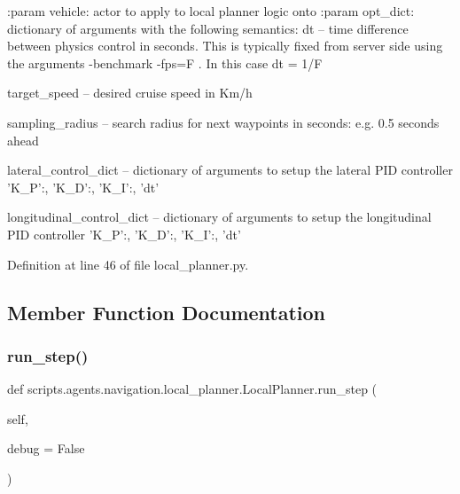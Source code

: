 \begin{DoxyVerb}:param vehicle: actor to apply to local planner logic onto
:param opt_dict: dictionary of arguments with the following semantics:
    dt -- time difference between physics control in seconds. This is typically fixed from server side
  using the arguments -benchmark -fps=F . In this case dt = 1/F

    target_speed -- desired cruise speed in Km/h

    sampling_radius -- search radius for next waypoints in seconds: e.g. 0.5 seconds ahead

    lateral_control_dict -- dictionary of arguments to setup the lateral PID controller
                    {'K_P':, 'K_D':, 'K_I':, 'dt'}

    longitudinal_control_dict -- dictionary of arguments to setup the longitudinal PID controller
                        {'K_P':, 'K_D':, 'K_I':, 'dt'}
\end{DoxyVerb}
 

Definition at line 46 of file local\+\_\+planner.\+py.



\subsection{Member Function Documentation}
\mbox{\label{classscripts_1_1agents_1_1navigation_1_1local__planner_1_1LocalPlanner_aed8c6636540d123d047ee1e71443ae20}} 
\subsubsection{\texorpdfstring{run\+\_\+step()}{run\_step()}}
{\footnotesize\ttfamily def scripts.\+agents.\+navigation.\+local\+\_\+planner.\+Local\+Planner.\+run\+\_\+step (\begin{DoxyParamCaption}\item[{}]{self,  }\item[{}]{debug = {\ttfamily False} }\end{DoxyParamCaption})}

